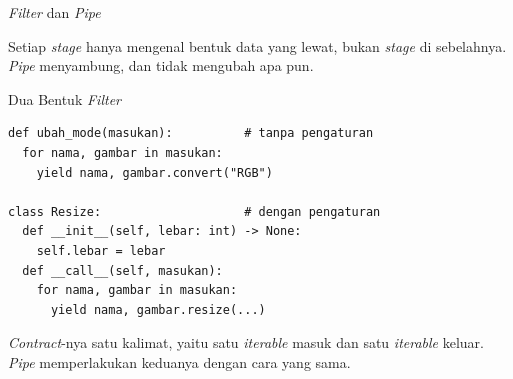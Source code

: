 \documentclass[aspectratio=169, table, 12pt]{beamer}
\begin{document}
\begin{frame}{{\Large \textit{Filter} dan \textit{Pipe}}}
  \vspace{14pt}
  \centering

  \vspace{10pt}
  {\small Setiap \textit{stage} hanya mengenal bentuk data yang lewat, bukan
  \textit{stage} di sebelahnya. \textit{Pipe} menyambung, dan tidak mengubah apa
  pun.}
\end{frame}

\begin{frame}[fragile]{{\Large Dua Bentuk \textit{Filter}}}
  \vspace{4pt}
\begin{lstlisting}[style=PythonStyle]
def ubah_mode(masukan):          # tanpa pengaturan
  for nama, gambar in masukan:
    yield nama, gambar.convert("RGB")

class Resize:                    # dengan pengaturan
  def __init__(self, lebar: int) -> None:
    self.lebar = lebar
  def __call__(self, masukan):
    for nama, gambar in masukan:
      yield nama, gambar.resize(...)
\end{lstlisting}
  \vspace{4pt}
  {\small \textit{Contract}-nya satu kalimat, yaitu satu \textit{iterable} masuk
  dan satu \textit{iterable} keluar. \textit{Pipe} memperlakukan keduanya dengan
  cara yang sama.}
\end{frame}
\end{document}
